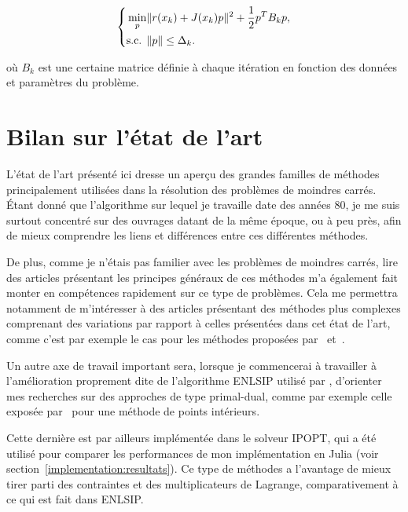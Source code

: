 \begin{equation}\label{sous_pb_trust_sqp}
    \left\{\begin{aligned}
    \underset{p}{\min} &\|r(x_k)+J(x_k)p\|^2+\dfrac{1}{2}p^TB_kp,\\
    \textnormal{s.c. }& \|p\|\leq \Delta_k.
    \end{aligned}\right.
\end{equation}

où $B_k$ est une certaine matrice définie à chaque itération en fonction des données et paramètres du problème.

\section{Bilan sur l'état de l'art}

L'état de l'art présenté ici dresse un aperçu des grandes familles de méthodes principalement utilisées dans la résolution des problèmes de moindres carrés. 
\'Etant donné que l'algorithme sur lequel je travaille date des années 80, je me suis surtout concentré sur des ouvrages datant de la même époque, 
ou à peu près, afin de mieux comprendre les liens et différences entre ces différentes méthodes.

De plus, comme je n'étais pas familier avec les problèmes de moindres carrés, lire des articles présentant les principes généraux de ces méthodes m'a également fait
monter en compétences rapidement sur ce type de problèmes. Cela me permettra notamment de m'intéresser à des articles présentant des méthodes plus complexes 
comprenant des variations par rapport à celles présentées dans cet état de l'art, comme c'est par exemple le cas pour les méthodes proposées par~\citet{orbansiq20} 
et~\citet{audicatoni11}.

Un autre axe de travail important sera, lorsque je commencerai à travailler à l'amélioration proprement dite de l'algorithme ENLSIP utilisé par \HQ, 
d'orienter mes recherches 
sur des approches de type primal-dual, comme par exemple celle exposée par~\citet{andreas02} pour une méthode de points intérieurs. 

Cette dernière est par ailleurs implémentée dans le solveur IPOPT, qui a été utilisé pour comparer les performances de mon implémentation en Julia (voir section~\ref{implementation:resultats}). 
Ce type de méthodes a l'avantage de mieux tirer parti des contraintes et des multiplicateurs de Lagrange, comparativement à ce qui est fait dans ENLSIP.
